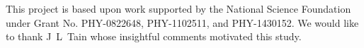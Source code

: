 \ack
This project is based upon work supported by the National Science
Foundation under Grant No. PHY-0822648, PHY-1102511, and
PHY-1430152.
We would like to thank J~L~Tain whose insightful comments motivated this study.